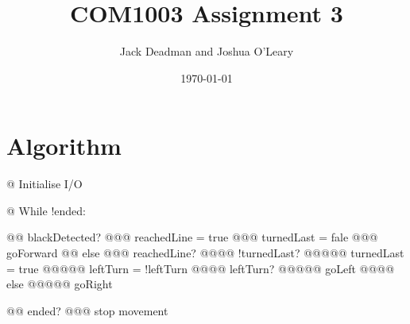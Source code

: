 \documentclass[a4paper]{report}
\title{COM1003 Assignment 3}
\author{Jack Deadman and Joshua O'Leary}
\date{\today}
\begin{document}
\maketitle

\section{Algorithm}
\begin{easylist}
@ Initialise I/O

@ While !ended:

@@ blackDetected?
@@@ reachedLine = true
@@@ turnedLast = fale
@@@ goForward
@@ else
@@@ reachedLine?
@@@@ !turnedLast?
@@@@@ turnedLast = true
@@@@@ leftTurn = !leftTurn
@@@@ leftTurn?
@@@@@ goLeft
@@@@ else
@@@@@ goRight

@@ ended?
@@@ stop movement


\end{easylist}
\end{document}
